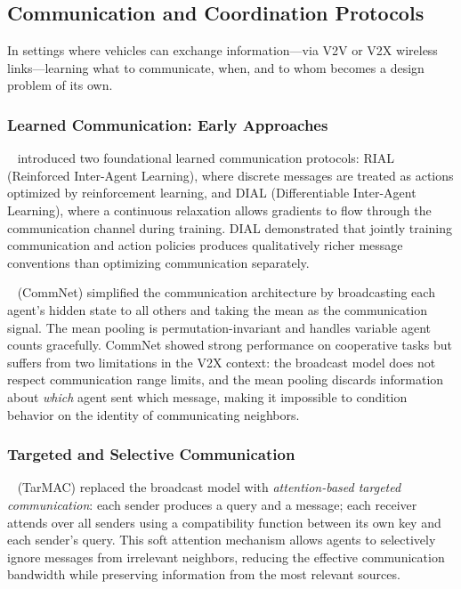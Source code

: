 \documentclass[12pt, a4paper]{article}
\begin{document}
\subsection{Communication and Coordination Protocols}
\label{sec:comm}

In settings where vehicles can exchange information---via V2V or V2X wireless
links---learning what to communicate, when, and to whom becomes a design
problem of its own.

\subsubsection{Learned Communication: Early Approaches}

\citeauthor{foerster2016learning}~\cite{foerster2016learning} introduced two
foundational learned communication protocols: RIAL (Reinforced Inter-Agent
Learning), where discrete messages are treated as actions optimized by
reinforcement learning, and DIAL (Differentiable Inter-Agent Learning), where
a continuous relaxation allows gradients to flow through the communication
channel during training.  DIAL demonstrated that jointly training
communication and action policies produces qualitatively richer message
conventions than optimizing communication separately.

\citeauthor{sukhbaatar2016learning}~\cite{sukhbaatar2016learning} (CommNet)
simplified the communication architecture by broadcasting each agent's hidden
state to all others and taking the mean as the communication signal.  The mean
pooling is permutation-invariant and handles variable agent counts gracefully.
CommNet showed strong performance on cooperative tasks but suffers from two
limitations in the V2X context: the broadcast model does not respect
communication range limits, and the mean pooling discards information about
\emph{which} agent sent which message, making it impossible to condition
behavior on the identity of communicating neighbors.

\subsubsection{Targeted and Selective Communication}

\citeauthor{das2019tarmac}~\cite{das2019tarmac} (TarMAC) replaced the broadcast
model with \emph{attention-based targeted communication}: each sender produces
a query and a message; each receiver attends over all senders using a
compatibility function between its own key and each sender's query.  This
soft attention mechanism allows agents to selectively ignore messages from
irrelevant neighbors, reducing the effective communication bandwidth while
preserving information from the most relevant sources.
\end{document}
